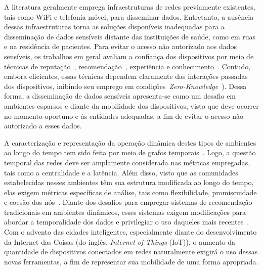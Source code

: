 \documentclass[12pt]{article}
\newcommand{\as}[1]{\textcolor{blue}{{\bf #1}}}
\newcommand{\al}[1]{\textcolor{brown}{{\bf #1}}}
\begin{document}
A literatura geralmente emprega infraestruturas de redes previamente existentes, tais como WiFi e telefonia móvel, para disseminar dados.
Entretanto, a ausência dessas infraestruturas torna as soluções disponíveis inadequadas para a disseminação de dados sensíveis
distante das
instituições de saúde, como em ruas e na residência de pacientes. Para evitar o acesso não autorizado aos dados sensíveis, os trabalhos
em geral avaliam a confiança dos dispositivos por meio de técnicas de reputação~\cite{truong2017toward}, recomendação~\cite{al2017trust}, experiência e conhecimento~\cite{truong2017toward}. Contudo,
embora eficientes,
essas técnicas dependem
claramente
das interações passadas dos dispositivos, inibindo seu emprego em condições~\textit{Zero-Knowledge}~\cite{kim2015hcs}).
Dessa forma, a disseminação de dados sensíveis apresenta-se como um desafio em ambientes esparsos e diante da mobilidade dos dispositivos, visto que deve ocorrer no momento oportuno e às entidades adequadas, a fim de evitar o acesso não autorizado a esses dados.

A caracterização e representação
da operação dinâmica
destes
tipos de
ambientes ao longo do tempo tem sido 
feita 
por meio de grafos temporais~\cite{nzeko2017time}. 
Logo,
a questão temporal
das redes
deve ser amplamente considerada nas métricas empregadas, tais como a centralidade e a latência. Além disso, visto que as comunidades estabelecidas nesses ambientes têm sua estrutura modificada ao longo do tempo, elas exigem métricas específicas 
de %
análise, tais como flexibilidade, promiscuidade e coesão dos nós~\cite{sizemore2018dynamic}. Diante dos desafios para empregar sistemas de recomendação tradicionais em ambientes dinâmicos, esses sistemas 
exigem modificações para abordar a temporalidade dos dados
e privilegiar
o uso daqueles mais recentes~\cite{nzeko2017time}. Com o advento das cidades inteligentes, especialmente diante do desenvolvimento da Internet das Coisas (do inglês, \textit{Internet of Things} (IoT)), o aumento da quantidade de dispositivos conectados em redes naturalmente exigirá o uso dessas novas ferramentas, a fim de representar sua mobilidade de uma forma apropriada.
\end{document}

